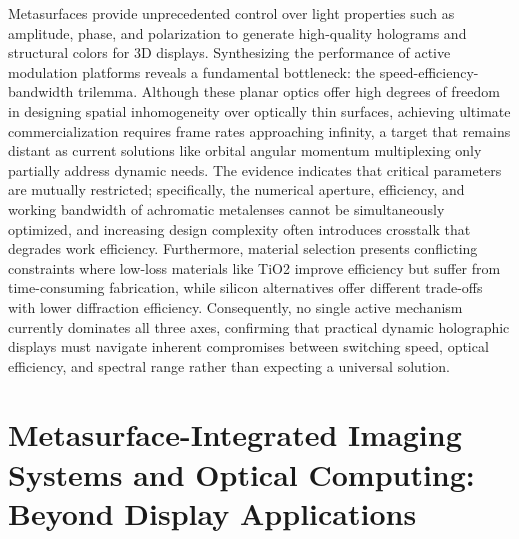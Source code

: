 Metasurfaces provide unprecedented control over light properties such as amplitude, phase, and polarization to generate high-quality holograms and structural colors for 3D displays. Synthesizing the performance of active modulation platforms reveals a fundamental bottleneck: the speed-efficiency-bandwidth trilemma. Although these planar optics offer high degrees of freedom in designing spatial inhomogeneity over optically thin surfaces, achieving ultimate commercialization requires frame rates approaching infinity, a target that remains distant as current solutions like orbital angular momentum multiplexing only partially address dynamic needs. The evidence indicates that critical parameters are mutually restricted; specifically, the numerical aperture, efficiency, and working bandwidth of achromatic metalenses cannot be simultaneously optimized, and increasing design complexity often introduces crosstalk that degrades work efficiency. Furthermore, material selection presents conflicting constraints where low-loss materials like TiO2 improve efficiency but suffer from time-consuming fabrication, while silicon alternatives offer different trade-offs with lower diffraction efficiency. Consequently, no single active mechanism currently dominates all three axes, confirming that practical dynamic holographic displays must navigate inherent compromises between switching speed, optical efficiency, and spectral range rather than expecting a universal solution. \citep{doi_10_1515_nanoph_2025_0269_b999ce93} \citep{doi_10_1002_inf2_12116_b5c46838}

\section{Metasurface-Integrated Imaging Systems and Optical Computing: Beyond Display Applications}\label{metasurface-integrated-imaging-systems-and-optical-computing-beyond-display-applications}

